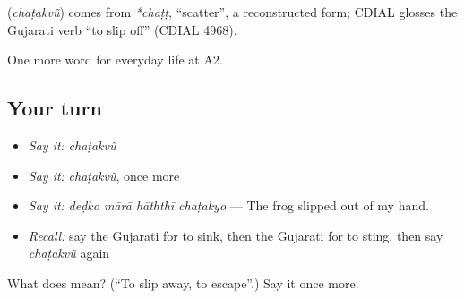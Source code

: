 \begin{cousinweb}
\textbf{} (\emph{chaṭakvũ}) comes from \emph{*chaṭṭ}, \textquotedblleft{}scatter\textquotedblright{}, a reconstructed form; CDIAL glosses the Gujarati verb \textquotedblleft{}to slip off\textquotedblright{} (CDIAL 4968).
\end{cousinweb}

\begin{grammarlens}[title={What you've built}]
One more word for everyday life at A2.
\end{grammarlens}

\subsection*{Your turn}
\begin{itemize}
\raggedright
  \item \emph{Say it:} \emph{chaṭakvũ}
  \item \emph{Say it:} \emph{chaṭakvũ}, once more
  \item \emph{Say it:} \emph{deḍko mārā hāththī chaṭakyo} — The frog slipped out of my hand.
  \item \emph{Recall:} say the Gujarati for to sink, then the Gujarati for to sting, then say \emph{chaṭakvũ} again
\end{itemize}

\begin{tcolorbox}[breakable,colback=teal!4,colframe=teal!35!black,title={Before you move on}]
What does  mean? (\textquotedblleft{}To slip away, to escape\textquotedblright{}.) Say it once more.
\end{tcolorbox}
